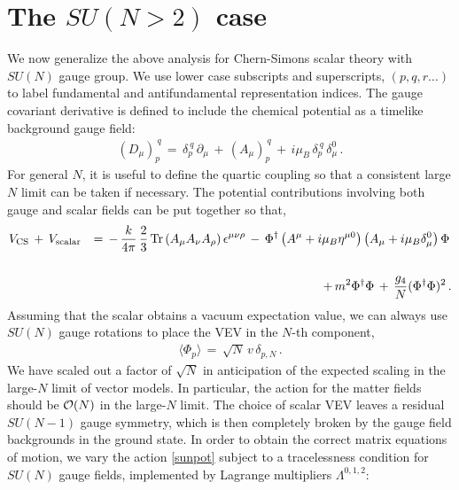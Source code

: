  \section{The $SU(N>2)$ case}
 \label{sec4}
 We now generalize the above analysis for Chern-Simons scalar theory with $SU(N) $ gauge group. 
 We use lower case subscripts and superscripts, $(p,q,r\ldots)$ to label  fundamental and  antifundamental representation indices. The gauge covariant derivative is defined to include the chemical potential as a timelike background gauge field:
  \begin{eqnarray}
(D_{\mu})_{p}^{\ q}\,=\,\delta_{p}^{\ q}\,\partial_{\mu}\,+\,(A_{\mu})_{p}^{\ q}\,+\,i\mu_{B}\, \delta_{p}^{\ q}\,\delta_{\mu}^{0}\,. 
\end{eqnarray}
For general $N$, it is useful to define the quartic coupling so that a consistent large $N$ limit can be taken if necessary.  The potential contributions involving both gauge and scalar fields can be put together so that,
\begin{eqnarray}
V_{\rm CS}\,+\, V_{\rm scalar}&&=\, -\,\frac{k}{4\pi}\,\frac{2}{3}\,{\rm Tr}\left(A_\mu A_\nu A_\rho\right)\epsilon^{\mu\nu\rho}\,-\,
\Phi^{\dagger}\left(A^\mu + i\mu_B\eta^{\mu 0}\right)\left(A_\mu + i\mu_B\delta_{\mu}^0\right)\Phi\,\nonumber\\\label{sunpot}\\\nonumber
&&%
+\,m^{2}\Phi^{\dagger}
\Phi\,+\,\frac{g_{4}}{N}(\Phi^{\dagger}\Phi)^{2}\,.
\end{eqnarray}
Assuming that the scalar obtains a vacuum expectation value, we can always use $SU(N)$ gauge rotations to place the VEV in the $N$-th component,
\begin{eqnarray}
\langle\Phi_{p}\rangle\,=\,\sqrt{N}\,v \,\delta_{p,N}\label{sclarvev}\,.
\end{eqnarray}
We have scaled out a factor of $\sqrt N$ in anticipation of the expected scaling in the  large-$N$ limit of vector models. In particular, the action for the matter fields should be ${\cal O}(N)$ in the large-$N$ limit.
The choice of scalar VEV leaves a residual $SU(N-1)$ gauge symmetry, which is then completely broken by the gauge field backgrounds in the ground state. In order to obtain the correct matrix equations of motion, we vary the action \eqref{sunpot} subject to a tracelessness condition for $SU(N)$ gauge fields, implemented by Lagrange multipliers $\Lambda^{0,1,2}$:
